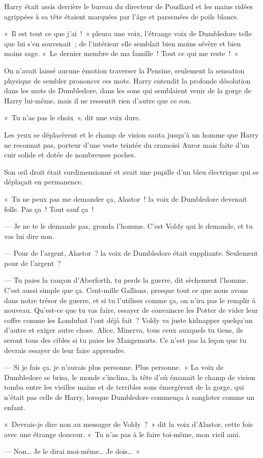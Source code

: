 \begin{em}
Harry était assis derrière le bureau du directeur de Poudlard et les mains ridées agrippées à sa tête étaient marquées par l'âge et parsemées de poils blancs.

«~Il est tout ce que j'ai~!~»
pleura une voix, l'étrange voix de Dumbledore telle que lui s'en souvenait~; de l'intérieur elle semblait bien moins sévère et bien moins sage.
«~Le dernier membre de ma famille~!
Tout ce qui me reste~!~»

On n'avait laissé aucune émotion traverser la Pensine, seulement la sensation physique de sembler prononcer ces mots.
Harry entendit la profonde désolation dans les mots de Dumbledore, dans les sons qui semblaient venir de la gorge de Harry lui-même, mais il ne ressentit rien d'autre que ce son.

«~Tu n'as pas le choix~», dit une voix dure.

Les yeux se déplacèrent et le champ de vision sauta jusqu'à un homme que Harry ne reconnut pas, porteur d'une veste teintée du cramoisi Auror mais faite d'un cuir solide et dotée de nombreuses poches.

Son œil droit était surdimensionné et avait une pupille d'un bleu électrique qui se déplaçait en permanence.

«~Tu ne peux pas me demander ça, Alastor~! la voix de Dumbledore devenait folle.
Pas ça~!
Tout sauf ça~!

--- Je ne te le demande pas, gronda l'homme.
C'est Voldy qui le demande, et tu vas lui dire non.

--- Pour de l'argent, Alastor~? la voix de Dumbledore était suppliante.
Seulement pour de l'argent~?

--- Tu paies la rançon d'Aberforth, tu perds la guerre, dit sèchement l'homme.
C'est aussi simple que ça.
Cent-mille Gallions, presque tout ce que nous avons dans notre trésor de guerre, et si tu l'utilises comme ça, on n'ira pas le remplir à nouveau.
Qu'est-ce que tu vas faire, essayer de convaincre les Potter de vider leur coffre comme les Londubat l'ont déjà fait~?
Voldy va juste kidnapper quelqu'un d'autre et exiger autre chose.
Alice, Minerva, tous ceux auxquels tu tiens, ils seront tous des cibles si tu paies les Mangemorts.
Ce n'est pas la leçon que tu devrais essayer de leur faire apprendre.

--- Si je fais ça, je n'aurais plus personne.
Plus personne.~»
La voix de Dumbledore se brisa, le monde s'inclina, la tête d'où émanait le champ de vision tomba entre les vieilles mains et de terribles sons émergèrent de la gorge, qui n'était pas celle de Harry, lorsque Dumbledore commença à sangloter comme un enfant.

«~Devrais-je dire non au messager de Voldy~?~»
dit la voix d'Alastor, cette fois avec une étrange douceur.
«~Tu n'as pas à le faire toi-même, mon vieil ami.

--- Non…
Je le dirai moi-même…
Je dois…~»
\end{em}


